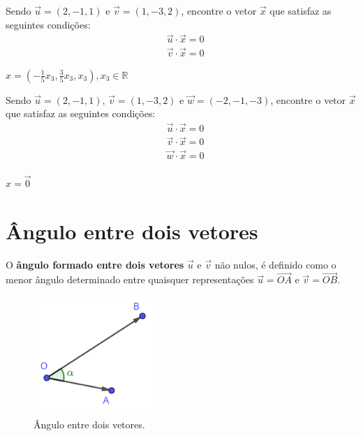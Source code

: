 \begin{exer}
  Sendo $\vec{u}=(2,-1,1)$ e $\vec{v}=(1,-3,2)$, encontre o vetor $\vec{x}$ que satisfaz as seguintes condições:
  \begin{align}
    &\vec{u}\cdot\vec{x} = 0\\
    &\vec{v}\cdot\vec{x} = 0
  \end{align}
\end{exer}
\begin{resp}
  $\displaystyle x = \left(-\frac{1}{5}x_3, \frac{3}{5}x_3, x_3\right), x_3\in\mathbb{R}$
\end{resp}

\begin{exer}
  Sendo $\vec{u}=(2,-1,1)$, $\vec{v}=(1,-3,2)$ e $\vec{w}=(-2,-1,-3)$, encontre o vetor $\vec{x}$ que satisfaz as seguintes condições:
  \begin{align}
    &\vec{u}\cdot\vec{x} = 0\\
    &\vec{v}\cdot\vec{x} = 0\\
    &\vec{w}\cdot\vec{x} = 0\\
  \end{align}
\end{exer}
\begin{resp}
  $x = \vec{0}$
\end{resp}

\section{Ângulo entre dois vetores}\label{cap_prodesc_sec_angulo}
\badgeRevisar

O {\bf ângulo formado entre dois vetores} $\vec{u}$ e $\vec{v}$ não nulos, é definido como o menor ângulo determinado entre quaisquer representações $\vec{u} = \overrightarrow{OA}$ e $\vec{v} = \overrightarrow{OB}$.

\begin{figure}[H]
  \centering
  \includegraphics[width=0.4\textwidth]{./cap_prodesc/dados/fig_vetangulo/fig_vetangulo}
  \caption{Ângulo entre dois vetores.}
  \label{fig:prodesc_vetangulo}
\end{figure}

